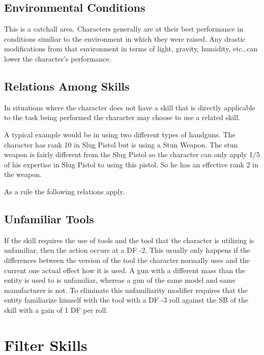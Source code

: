 \subsection{Environmental Conditions}

This is a catchall area. Characters generally are at their best 
performance in conditions similiar to the environment in which they 
were raised. Any drastic modifications from that environment in 
terms of light, gravity, humidity, etc\dots can lower the character's 
performance.



\subsection{Relations Among Skills}

In situations where the character does not have a skill that
is directly applicable to the task being performed the character 
may choose to use a related skill.

A typical example would be in using two different types of handguns. The
character has rank 10 in Slug Pistol but is using a Stun Weapon. The stun
weapon is fairly different from the Slug Pistol so the character can only
apply 1/5 of his expertise in Slug Pistol to using this pistol. So he has
an effective rank 2 in the weapon.

As a rule the following relations apply.


\subsection{Unfamiliar Tools}

If the skill requires the use of tools and the tool that the character is
utilizing is unfamiliar, then the action occurs at a DF -2. This usually
only happens if the differences between the version of the tool the
character normally uses and the current one actual effect how it is
used. A gun with a different mass than the entity is used to is
unfamiliar, whereas a gun of the same model and same manufacturer is
not. To eliminate this unfamiliarity modifier requires that the entity
familiarize himself with the tool with a DF -3 roll against the SB of 
the skill with a gain of 1 DF per roll. 

\section{Filter Skills}

